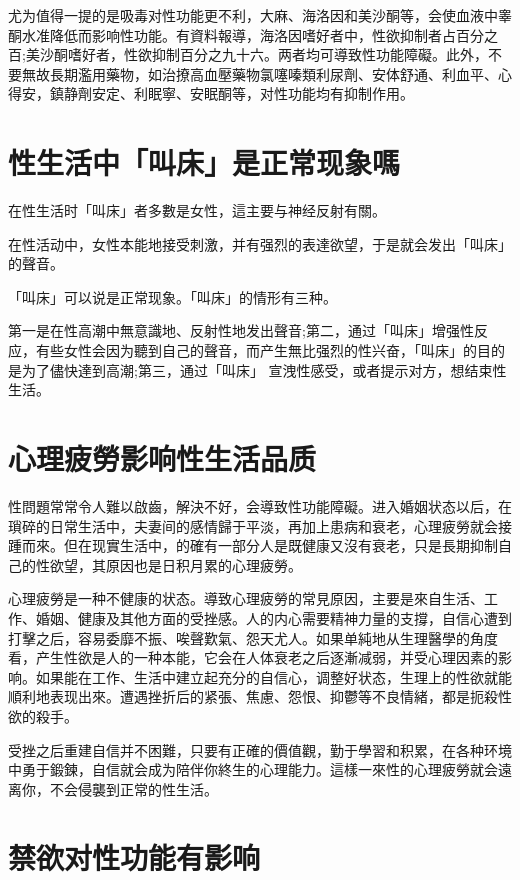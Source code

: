 \documentclass[12pt,UTF8]{ctexbook}
\begin{document}
尤为值得一提的是吸毒对性功能更不利，大麻、海洛因和美沙酮等，会使血液中睾酮水准降低而影响性功能。有資料報導，海洛因嗜好者中，性欲抑制者占百分之百;美沙酮嗜好者，性欲抑制百分之九十六。两者均可導致性功能障礙。此外，不要無故長期濫用藥物，如治撩高血壓藥物氯噻嗪類利尿劑、安体舒通、利血平、心得安，鎮静劑安定、利眠寧、安眠酮等，对性功能均有抑制作用。

\section{性生活中「叫床」是正常现象嗎}

在性生活时「叫床」者多數是女性，這主要与神经反射有關。

在性活动中，女性本能地接受刺激，并有强烈的表達欲望，于是就会发出「叫床」的聲音。

「叫床」可以说是正常现象。「叫床」的情形有三种。

第一是在性高潮中無意識地、反射性地发出聲音;第二，通过「叫床」增强性反应，有些女性会因为聽到自己的聲音，而产生無比强烈的性兴奋，「叫床」的目的是为了儘快達到高潮;第三，通过「叫床」
宣洩性感受，或者提示对方，想结束性生活。

\section{心理疲勞影响性生活品质}

性問題常常令人難以啟齒，解決不好，会導致性功能障礙。进入婚姻状态以后，在瑣碎的日常生活中，夫妻间的感情歸于平淡，再加上患病和衰老，心理疲勞就会接踵而來。但在现實生活中，的確有一部分人是既健康又沒有衰老，只是長期抑制自己的性欲望，其原因也是日积月累的心理疲勞。

心理疲勞是一种不健康的状态。導致心理疲勞的常見原因，主要是來自生活、工作、婚姻、健康及其他方面的受挫感。人的内心需要精神力量的支撐，自信心遭到打擊之后，容易委靡不振、唉聲歎氣、怨天尤人。如果单純地从生理醫學的角度看，产生性欲是人的一种本能，它会在人体衰老之后逐漸减弱，并受心理因素的影响。如果能在工作、生活中建立起充分的自信心，调整好状态，生理上的性欲就能順利地表现出來。遭遇挫折后的紧張、焦慮、怨恨、抑鬱等不良情緒，都是扼殺性欲的殺手。

受挫之后重建自信并不困難，只要有正確的價值觀，勤于學習和积累，在各种环境中勇于鍛鍊，自信就会成为陪伴你終生的心理能力。這樣一來性的心理疲勞就会遠离你，不会侵襲到正常的性生活。

\section{禁欲对性功能有影响}
\end{document}
